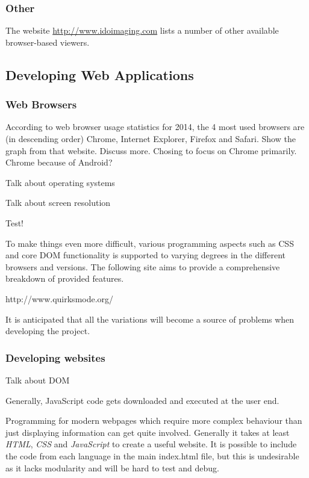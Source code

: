 \documentclass[a4paper,11pt,titlepage]{article}
\begin{document}
\subsubsection{Other}

The website \url{http://www.idoimaging.com} lists a number of other available browser-based viewers.


\subsection{Developing Web Applications}

\subsubsection{Web Browsers}

According to web browser usage statistics for 2014, the 4 most used
browsers are (in descending order) Chrome, Internet Explorer, Firefox
and Safari. Show the graph from that website. Discuss more. Chosing to focus on Chrome primarily. Chrome because of Android?


Talk about operating systems

Talk about screen resolution

Test!

To make things even more difficult, various programming aspects such as CSS and core DOM functionality is supported to varying degrees in the different browsers and versions. The following site aims to provide a comprehensive breakdown of provided features.

http://www.quirksmode.org/

It is anticipated that all the variations will become a source of problems when developing the project.



\subsubsection{Developing websites}

Talk about DOM


Generally, JavaScript code gets downloaded and executed at the user end.


Programming for modern webpages which require more complex behaviour than just displaying information can get quite involved. Generally it takes at least \textit{HTML}, \textit{CSS} and \textit{JavaScript} to create a useful website. It is possible to include the code from each language in the main index.html file, but this is undesirable as it lacks modularity and will be hard to test and debug.
\end{document}
